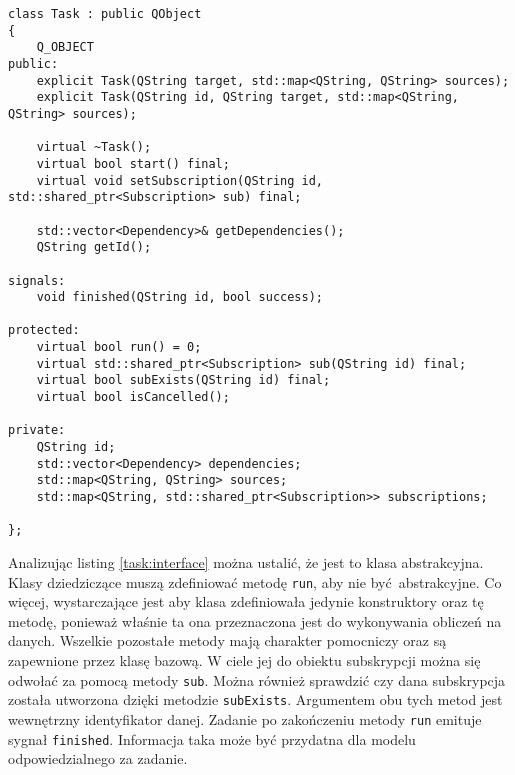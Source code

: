 \begin{minipage}{\textwidth}
	\begin{lstlisting}[label=task:interface, caption={Interfejs klasy \lstinline$Task$},alsoletter={()[].=}]
class Task : public QObject
{
	Q_OBJECT
public:
	explicit Task(QString target, std::map<QString, QString> sources);
	explicit Task(QString id, QString target, std::map<QString, QString> sources);

	virtual ~Task();
	virtual bool start() final;
	virtual void setSubscription(QString id, std::shared_ptr<Subscription> sub) final;

	std::vector<Dependency>& getDependencies();
	QString getId();

signals:
	void finished(QString id, bool success);

protected:
	virtual bool run() = 0;
	virtual std::shared_ptr<Subscription> sub(QString id) final;
	virtual bool subExists(QString id) final;
	virtual bool isCancelled();

private:
	QString id;
	std::vector<Dependency> dependencies;
	std::map<QString, QString> sources;
	std::map<QString, std::shared_ptr<Subscription>> subscriptions;

};
	\end{lstlisting}
\end{minipage}

Analizując listing \ref{task:interface} można ustalić, że jest to klasa abstrakcyjna. Klasy dziedziczące muszą zdefiniować metodę \lstinline$run$, aby nie być abstrakcyjne. Co więcej, wystarczające jest aby klasa zdefiniowała jedynie konstruktory oraz tę metodę, ponieważ właśnie ta ona przeznaczona jest do wykonywania obliczeń na danych. Wszelkie pozostałe metody mają charakter pomocniczy oraz są zapewnione przez klasę bazową. W ciele jej do obiektu subskrypcji można się odwołać za pomocą metody \lstinline$sub$. Można również sprawdzić czy dana subskrypcja została utworzona dzięki metodzie \lstinline$subExists$. Argumentem obu tych metod jest wewnętrzny identyfikator danej. Zadanie po zakończeniu metody \lstinline$run$ emituje sygnał \lstinline$finished$. Informacja taka może być przydatna dla modelu odpowiedzialnego za zadanie.

